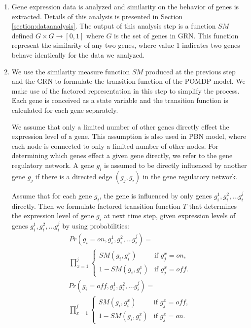 \begin{enumerate}
\item Gene expression data is analyzed and similarity on the behavior of genes is extracted. Details 
of this analysis is presented in Section \ref{section:dataanalysis}. The output of this analysis step 
is a function $SM$ defined $G \times G \to [0,1]$ where $G$ is the set of genes in GRN. This function 
represent the similarity of any two genes, where value 1 indicates two genes behave identically for the
data we analyzed.

\item We use the similarity measure function $SM$ produced at the previous step and the GRN to formulate 
the transition function of the POMDP model. We make use of the factored representation in this step 
to simplify the process. Each gene is conceived as a state variable and the transition function is calculated 
for each gene separately.

We assume that only a limited number of other genes directly effect the expression level of a gene. 
This assumption is also used in PBN model, where each node is connected to only a limited number of 
other nodes. For determining which genes effect a given gene directly, we refer to the gene regulatory
network. A gene $g_i$ is assumed to be directly influenced by another gene $g_j$ if there is a directed
edge $(g_j,g_i)$ in the gene regulatory network.

Assume that for each gene $g_i$, the gene is influenced by only genes $g_i ^1, g_i^2,... g_i^j$
directly. Then we formulate factored transition function $T$ that determines the expression level of 
gene $g_i$ at next time step, given expression levels of genes  $g_i ^1, g_i^2,... g_i^j$ by using 
probabilities:
\begin{multline}
Pr(g_i = on , g_i ^1, g_i^2,... g_i^j ) = \\
 \prod_{x = 1}^j 
\begin{cases}
SM(g_i,g_i^x) & \text{if } g_j^x = on,\\
1 - SM(g_i,g_i^x) & \text{if } g_j^x = off.
\end{cases}
\end{multline}
\begin{multline}
Pr(g_i = off , g_i ^1, g_i^2,... g_i^j ) = \\
\prod_{x = 1}^j 
\begin{cases}
SM(g_i,g_i^x) & \text{if } g_j^x = off,\\
1 - SM(g_i,g_i^x) & \text{if } g_j^x = on.
\end{cases}
\end{multline}


\end{enumerate}
